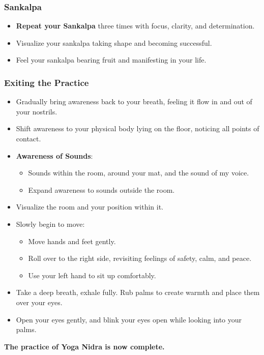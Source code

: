 \begin{frame}[fragile]\frametitle{Sankalpa}
    \begin{itemize}
        \item \textbf{Repeat your Sankalpa} three times with focus, clarity, and determination.
        \item Visualize your sankalpa taking shape and becoming successful.
        \item Feel your sankalpa bearing fruit and manifesting in your life.
    \end{itemize}
\end{frame}

\begin{frame}[fragile]\frametitle{Exiting the Practice}
    \begin{itemize}
        \item Gradually bring awareness back to your breath, feeling it flow in and out of your nostrils.
        \item Shift awareness to your physical body lying on the floor, noticing all points of contact.
        \item \textbf{Awareness of Sounds}:
            \begin{itemize}
                \item Sounds within the room, around your mat, and the sound of my voice.
                \item Expand awareness to sounds outside the room.
            \end{itemize}
        \item Visualize the room and your position within it.
        \item Slowly begin to move: 
            \begin{itemize}
                \item Move hands and feet gently.
                \item Roll over to the right side, revisiting feelings of safety, calm, and peace.
                \item Use your left hand to sit up comfortably.
            \end{itemize}
        \item Take a deep breath, exhale fully. Rub palms to create warmth and place them over your eyes.
        \item Open your eyes gently, and blink your eyes open while looking into your palms.
    \end{itemize}
    \vspace{0.5cm}
    \textbf{The practice of Yoga Nidra is now complete.}
\end{frame}


